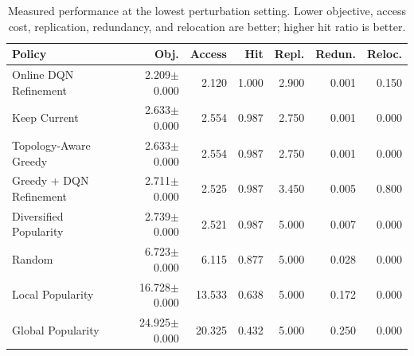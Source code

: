 \begin{table}[t]
\centering
\caption{Measured performance at the lowest perturbation setting. Lower objective, access cost, replication, redundancy, and relocation are better; higher hit ratio is better.}
\label{tab:measured_results}
\scriptsize
\setlength{\tabcolsep}{2pt}
\begin{tabular}{lrrrrrr}
\toprule
Policy & Obj. & Access & Hit & Repl. & Redun. & Reloc. \\
\midrule
Online DQN Refinement & 2.209$\pm$0.000 & 2.120 & 1.000 & 2.900 & 0.001 & 0.150 \\
Keep Current & 2.633$\pm$0.000 & 2.554 & 0.987 & 2.750 & 0.001 & 0.000 \\
Topology-Aware Greedy & 2.633$\pm$0.000 & 2.554 & 0.987 & 2.750 & 0.001 & 0.000 \\
Greedy + DQN Refinement & 2.711$\pm$0.000 & 2.525 & 0.987 & 3.450 & 0.005 & 0.800 \\
Diversified Popularity & 2.739$\pm$0.000 & 2.521 & 0.987 & 5.000 & 0.007 & 0.000 \\
Random & 6.723$\pm$0.000 & 6.115 & 0.877 & 5.000 & 0.028 & 0.000 \\
Local Popularity & 16.728$\pm$0.000 & 13.533 & 0.638 & 5.000 & 0.172 & 0.000 \\
Global Popularity & 24.925$\pm$0.000 & 20.325 & 0.432 & 5.000 & 0.250 & 0.000 \\
\bottomrule
\end{tabular}
\end{table}

